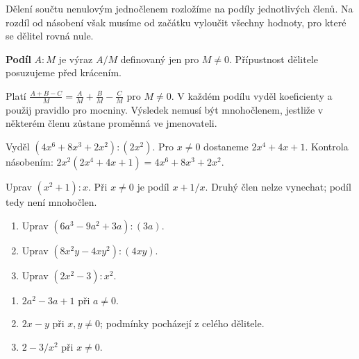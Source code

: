 \documentclass[11pt,a4paper]{article}
\begin{document}

Dělení součtu nenulovým jednočlenem rozložíme na podíly jednotlivých členů. Na rozdíl od násobení však musíme od začátku vyloučit všechny hodnoty, pro které se dělitel rovná nule.

\begin{definiceBox}[title={Připomenutí definice},breakable=false]
\textbf{Podíl} $A:M$ je výraz $A/M$ definovaný jen pro $M\ne0$. Přípustnost dělitele posuzujeme před krácením.
\end{definiceBox}


Platí $\frac{A+B-C}{M}=\frac A M+\frac B M-\frac C M$ pro $M\ne0$. V každém podílu vyděl koeficienty a použij pravidlo pro mocniny. Výsledek nemusí být mnohočlenem, jestliže v některém členu zůstane proměnná ve jmenovateli.


\begin{prikladReseniBox}[title={Příklad 1},breakable=false]
Vyděl $(4x^6+8x^3+2x^2):(2x^2)$.
\tcblower
Pro $x\ne0$ dostaneme $2x^4+4x+1$. Kontrola násobením: $2x^2(2x^4+4x+1)=4x^6+8x^3+2x^2$.
\end{prikladReseniBox}


\begin{prikladReseniBox}[title={Příklad 2},breakable=false]
Uprav $(x^2+1):x$.
\tcblower
Při $x\ne0$ je podíl $x+1/x$. Druhý člen nelze vynechat; podíl tedy není mnohočlen.
\end{prikladReseniBox}



\begin{zadaniReseniBox}[title={Procvičení},breakable=false]
\begin{enumerate}[label=\alph*)]
\item Uprav $(6a^3-9a^2+3a):(3a)$.
\item Uprav $(8x^2y-4xy^2):(4xy)$.
\item Uprav $(2x^2-3):x^2$.
\end{enumerate}
\tcblower
\begin{enumerate}[label=\alph*)]
\item $2a^2-3a+1$ při $a\ne0$.
\item $2x-y$ při $x,y\ne0$; podmínky pocházejí z celého dělitele.
\item $2-3/x^2$ při $x\ne0$.
\end{enumerate}
\end{zadaniReseniBox}


\end{document}
